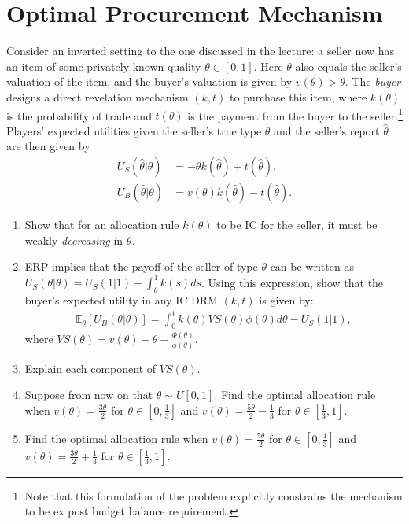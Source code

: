 \documentclass[a4paper]{article}
\begin{document}
\section{Optimal Procurement Mechanism}
	Consider an inverted setting to the one discussed in the lecture: a seller now has an item of some privately known quality $\theta \in [0,1]$. Here $\theta$ also equals the seller's valuation of the item, and the buyer's valuation is given by $v(\theta) > \theta$. The \emph{buyer} designs a direct revelation mechanism $(k,t)$ to purchase this item, where $k(\theta)$ is the probability of trade and $t(\theta)$ is the payment from the buyer to the seller.\footnote{Note that this formulation of the problem explicitly constrains the mechanism to be ex post budget balance requirement.} Players' expected utilities given the seller's true type $\theta$ and the seller's report $\hat{\theta}$ are then given by
	\begin{align*}
		U_S(\hat{\theta}|\theta) &= -\theta k(\hat{\theta}) + t(\hat{\theta}),
		\\
		U_B(\hat{\theta}|\theta) &= v(\theta) k(\hat{\theta}) - t(\hat{\theta}).
	\end{align*}
	\begin{enumerate}
		\item Show that for an allocation rule $k(\theta)$ to be IC for the seller, it must be weakly \emph{decreasing} in $\theta$.
		\item ERP implies that the payoff of the seller of type $\theta$ can be written as $U_S(\theta|\theta) = U_S(1|1) + \int_{\theta}^{1} k(s) ds $. Using this expression, show that the buyer's expected utility in any IC DRM $(k,t)$ is given by:
		\begin{align*}
			\mathbb{E}_\theta [ U_B(\theta | \theta) ] = \int_0^1 k(\theta) VS(\theta) \phi(\theta) d\theta - U_S(1|1),
		\end{align*}
		where $VS(\theta) = v(\theta) - \theta - \frac{\Phi(\theta)}{\phi(\theta)}$.
		\item Explain each component of $VS(\theta)$.
		\item Suppose from now on that $\theta \sim U[0,1]$. Find the optimal allocation rule when $v(\theta) = \frac{3\theta}{2}$ for $\theta \in [0,\frac{1}{3}]$ and $v(\theta) = \frac{5\theta}{2}-\frac{1}{3}$ for $\theta \in [\frac{1}{3},1]$.
		\item Find the optimal allocation rule when $v(\theta) = \frac{5\theta}{2}$ for $\theta \in [0,\frac{1}{3}]$ and $v(\theta) = \frac{3\theta}{2}+\frac{1}{3}$ for $\theta \in [\frac{1}{3},1]$.
	\end{enumerate}
		
\end{document}
